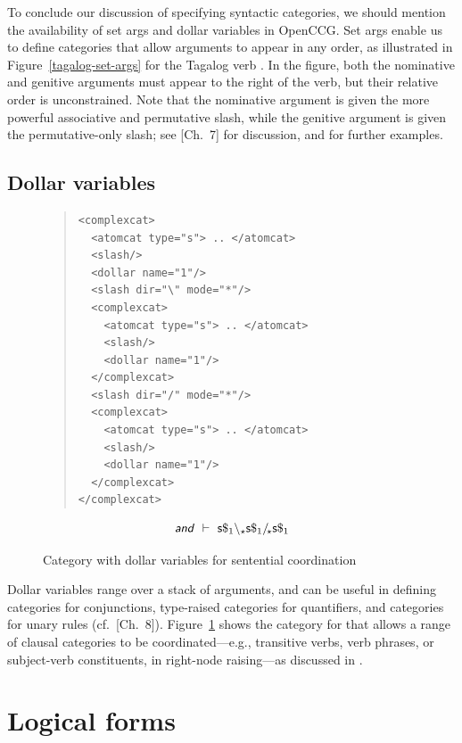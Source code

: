 \documentclass[11pt]{article}
\newcommand{\occg}{OpenCCG}
\begin{document}
To conclude our discussion of specifying syntactic categories, we should
mention the availability of set args and dollar variables in \occg. Set
args enable us to define categories that allow arguments to appear in
any order, as illustrated in Figure~\ref{tagalog-set-args} for the
Tagalog verb . In the figure, both the
nominative and genitive arguments must appear to the right of the verb,
but their relative order is unconstrained. Note that the nominative
argument is given the more powerful associative and permutative slash,
while the genitive argument is given the permutative-only slash; see
\cite{Baldridge:2002}[Ch.\ 7] for discussion, and
\cite{bozsahinsteedman03} for further examples.

\subsection{Dollar variables}

\begin{figure}
\begin{quote}
\begin{verbatim}
<complexcat>
  <atomcat type="s"> .. </atomcat>
  <slash/>
  <dollar name="1"/>
  <slash dir="\" mode="*"/>
  <complexcat>
    <atomcat type="s"> .. </atomcat>
    <slash/>
    <dollar name="1"/>
  </complexcat>
  <slash dir="/" mode="*"/>
  <complexcat>
    <atomcat type="s"> .. </atomcat>
    <slash/>
    <dollar name="1"/>
  </complexcat>
</complexcat>
\end{verbatim}
\end{quote}
\[
\textsf{\textsl{and}} ~ \vdash ~ \mathsf{s}\$_{1} \backslash_{\star} \mathsf{s}\$_{1} /\!_{\star} \mathsf{s}\$_{1}
\]
\caption{Category with dollar variables for sentential coordination}
\label{sent-coord-dollar}
\end{figure}

Dollar variables range over a stack of arguments, and can be useful in
defining categories for conjunctions, type-raised categories for
quantifiers, and categories for unary rules (cf.\
\cite{Baldridge:2002}[Ch.\ 8]). Figure~\ref{sent-coord-dollar} shows the
category for \gf{and} that allows a range of clausal categories to be
coordinated---e.g., transitive verbs, verb phrases, or subject-verb
constituents, in right-node raising---as discussed in
\cite{White-RLAC:2004}.


\section{Logical forms}
\label{lfs}
\end{document}
